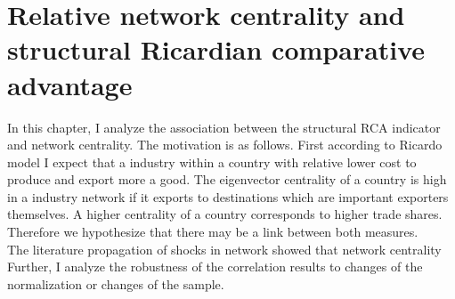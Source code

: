 \chapter{Relative network centrality and structural Ricardian comparative advantage}
In this chapter, I analyze the association between the structural RCA indicator and network centrality.
 The motivation is as follows.
First according to Ricardo model  I expect that a industry within a country with relative lower cost to produce and export more a good.
The eigenvector centrality  of a country is high in a industry network if it exports to destinations which are important exporters themselves.
 A higher centrality of a country corresponds to higher trade shares.
 Therefore we hypothesize that there may be a link between both measures. \\
The literature propagation of shocks in network  \cite{acemoglu2012} showed that network centrality
Further, I analyze the robustness of the correlation results to changes of the normalization or changes of the sample.
